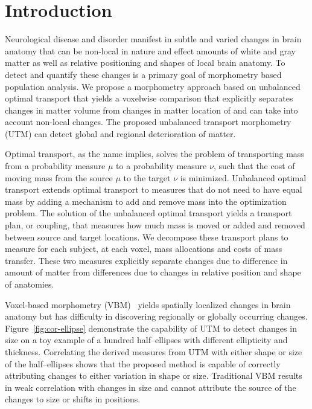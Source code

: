 \documentclass{llncs}
\begin{document}
\section{Introduction}
Neurological disease and disorder manifest in subtle and varied changes in
brain anatomy that can be non-local in nature and effect amounts of white and
gray matter as well as relative positioning and shapes of local brain anatomy.
To detect and quantify these changes is a primary goal of morphometry based
population analysis. We propose a morphometry approach based on unbalanced
optimal transport that yields a voxelwise comparison that explicitly separates
changes in matter volume from changes in matter location of and can take into
account non-local changes. The proposed unbalanced transport morphometry (UTM)
can detect global and regional deterioration of matter. 

Optimal transport, as the name implies, solves the problem of transporting mass
from a probability measure $\mu$ to a probability measure $\nu$, such that the
cost of moving mass from the source $\mu$ to the target $\nu$ is minimized.
Unbalanced optimal transport extends optimal transport to measures that do not
need to have equal mass by adding a mechanism to add and remove mass
into the optimization problem. The solution of the unbalanced optimal transport
yields a transport plan, or coupling, that measures how much mass is moved or
added and removed between source and target locations. We decompose these
transport plans to measure for each subject, at each voxel, mass allocations and
costs of mass transfer. These two measures explicitly separate changes due to
difference in amount of matter from differences due to changes in relative
position and shape of anatomies. 

Voxel-based morphometry (VBM)~\cite{ashburner1998identifying} yields spatially
localized changes in brain anatomy but has difficulty in discovering regionally
or globally occurring changes. Figure~\ref{fig:cor-ellipse} demonstrate the
capability of UTM to detect changes in size on a toy example of a hundred
half--ellipses with different ellipticity and thickness.  Correlating the
derived measures from UTM with either shape or size of the half--ellipses shows
that the proposed method is capable of correctly attributing changes to either
variation in shape or size.  Traditional VBM  results in weak correlation with
changes in size and cannot attribute the source of the changes to size or
shifts in positions.
\end{document}

